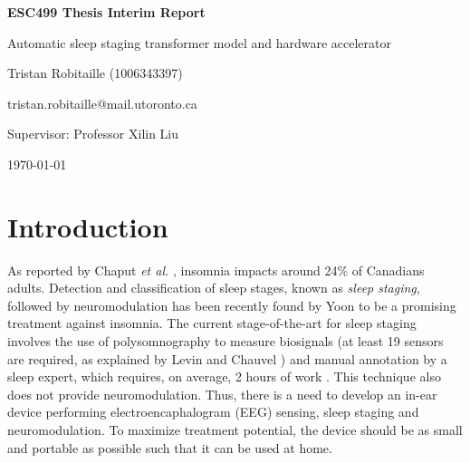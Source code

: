 \documentclass[12pt]{article}
\begin{document}
    \begin{titlepage}
        \centering
        {\LARGE\bfseries ESC499 Thesis Interim Report\par}
        {\Large Automatic sleep staging transformer model and hardware accelerator\par}
        \vspace*{\fill}
        \vspace{1cm}
        {\Large Tristan Robitaille (1006343397)\par}
        {\large tristan.robitaille@mail.utoronto.ca\par}
        \vspace{1cm}
        {\large Supervisor: Professor Xilin Liu\par}
        \vfill
        {\large \today\par}
        \thispagestyle{empty}
    \end{titlepage}

    \newpage
    \doublespacing %

    \pagestyle{fancy}
    \fancyhf{}
    \renewcommand{\headrulewidth}{0pt} %
    \rfoot{\thepage} %
    
    \tableofcontents
    \newpage

    \listoffigures

    \listoftables
    \newpage


    \section{Introduction}
    As reported by Chaput \textit{et al.} \cite{insomnia_prevalence}, insomnia impacts around 24\% of Canadians adults. Detection and classification of sleep stages, known as \textit{sleep staging}, followed by neuromodulation has been recently found by Yoon \cite{yoon2021neuromodulation} to be a promising
    treatment against insomnia. The current stage-of-the-art for sleep staging involves the use of polysomnography to measure biosignals (at least 19 sensors are required, as explained by Levin and Chauvel \cite{RUNDO2019381}) and manual annotation by a sleep expert, which requires, on average, 2 hours of work \cite{phan2022automatic}.
    This technique also does not provide neuromodulation. Thus, there is a need to develop an in-ear device performing electroencaphalogram (EEG) sensing, sleep staging and neuromodulation. To maximize treatment potential, the device should be as small and portable as possible such that it can be used at home.
    
\end{document}
